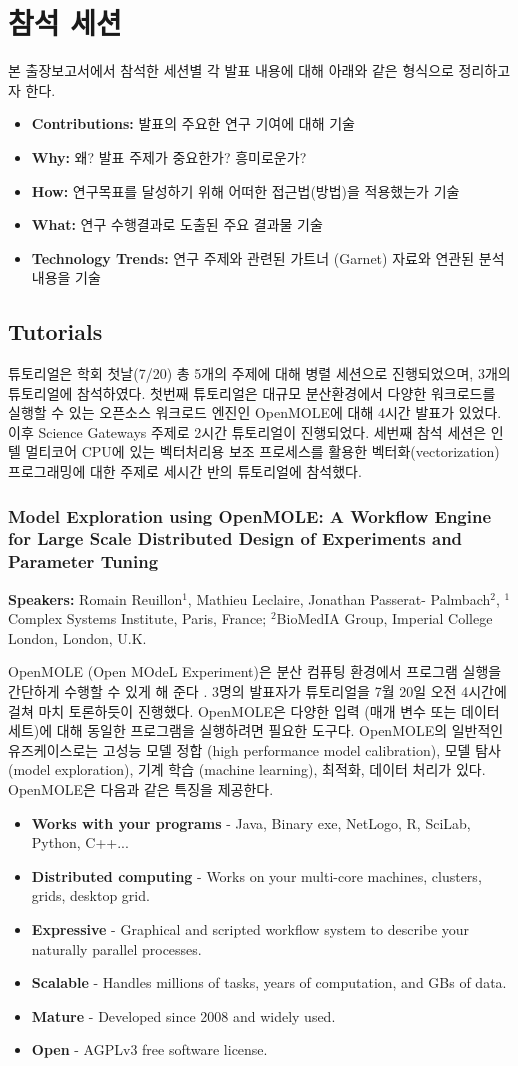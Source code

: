 \documentclass[twocolumn]{article}
\newcommand{\bi}{\begin{itemize}}
\newcommand{\ei}{\end{itemize}}
\newcommand{\ii}{\item}
\begin{document}
\section{참석 세션}
본 출장보고서에서 참석한 세션별 각 발표 내용에 대해 아래와 같은 형식으로 정리하고자 한다.
\bi
\ii \textbf{Contributions:} 발표의 주요한 연구 기여에 대해 기술
\ii \textbf{Why:} 왜? 발표 주제가 중요한가? 흥미로운가? 
\ii \textbf{How:} 연구목표를 달성하기 위해 어떠한 접근법(방법)을 적용했는가 기술
\ii \textbf{What:} 연구 수행결과로 도출된 주요 결과물 기술
\ii \textbf{Technology Trends:} 연구 주제와 관련된 가트너 (Garnet) 자료와 연관된 분석내용을 기술
\ei

\subsection{Tutorials}
튜토리얼은 학회 첫날(7/20) 총 5개의 주제에 대해 병렬 세션으로 진행되었으며, 3개의 튜토리얼에 참석하였다.
첫번째 튜토리얼은 대규모 분산환경에서 다양한 워크로드를 실행할 수 있는 오픈소스 워크로드 엔진인 OpenMOLE에 대해 4시간 발표가 있었다.
이후 Science Gateways 주제로 2시간 튜토리얼이 진행되었다. 세번째 참석 세션은 인텔 멀티코어 CPU에 있는 벡터처리용 보조 프로세스를 활용한 벡터화(vectorization) 프로그래밍에 대한 주제로 세시간 반의 튜토리얼에 참석했다.

\subsubsection{Model Exploration using OpenMOLE: A Workflow Engine for Large Scale Distributed Design of Experiments and Parameter Tuning}
\textbf{Speakers:} Romain Reuillon$^1$, Mathieu Leclaire, Jonathan Passerat- Palmbach$^2$, $^1$Complex Systems Institute, Paris, France; $^2$BioMedIA Group, Imperial College London, London, U.K.

OpenMOLE (Open MOdeL Experiment)은 분산 컴퓨팅 환경에서 프로그램 실행을 간단하게 수행할 수 있게 해 준다 \cite{openmole:2015}. 3명의 발표자가 튜토리얼을 7월 20일 오전 4시간에 걸쳐 마치 토론하듯이 진행했다.
OpenMOLE은 다양한 입력 (매개 변수 또는 데이터 세트)에 대해 동일한 프로그램을 실행하려면 필요한 도구다. 
OpenMOLE의 일반적인 유즈케이스로는 고성능 모델 정합 (high performance model calibration), 모델 탐사 (model exploration), 기계 학습 (machine learning), 최적화, 데이터 처리가 있다. OpenMOLE은 다음과 같은 특징을 제공한다.
\bi
\ii \textbf{Works with your programs} - Java, Binary exe, NetLogo, R, SciLab, Python, C++...
\ii \textbf{Distributed computing} - Works on your multi-core machines, clusters, grids, desktop grid.
\ii \textbf{Expressive} - Graphical and scripted workflow system to describe your naturally parallel processes.
\ii \textbf{Scalable} - Handles millions of tasks, years of computation, and GBs of data.
\ii \textbf{Mature} - Developed since 2008 and widely used.
\ii \textbf{Open} - AGPLv3 free software license.
\ei
\end{document}
